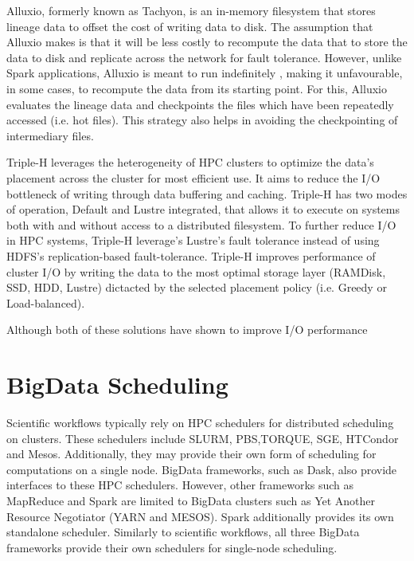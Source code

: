 \documentclass{report}
\begin{document}
                Alluxio, formerly known as Tachyon, is an in-memory filesystem
                that stores lineage data to offset the cost of writing data to 
                disk. The assumption that Alluxio makes is that it will be less
                costly to recompute the data that to store the data to disk and
                replicate across the network for fault tolerance. However,
                unlike Spark applications, Alluxio is meant to run indefinitely
                , making it unfavourable, in some cases, to recompute the data
                from its starting point. For this, Alluxio evaluates the 
                lineage data and checkpoints the files which have been 
                repeatedly accessed (i.e. hot files). This strategy also helps 
                in avoiding the checkpointing of intermediary files. 

                Triple-H leverages the heterogeneity of HPC clusters to 
                optimize the data's placement across the cluster for most 
                efficient use. It aims to reduce the I/O bottleneck of writing 
                through data buffering and caching. Triple-H has two modes of
                operation, Default and Lustre integrated,
                that allows it to execute on systems both with and without 
                access to a distributed filesystem. To further reduce I/O in
                HPC systems, Triple-H leverage's Lustre's fault tolerance 
                instead of using HDFS's replication-based fault-tolerance. 
                Triple-H improves 
                performance of cluster I/O by writing the data to
                the most optimal storage layer (RAMDisk, SSD, HDD, Lustre) 
                dictacted by the selected placement policy (i.e. Greedy or 
                Load-balanced). 

                Although both of these solutions have shown to improve I/O
                performance 
            
        \section{BigData Scheduling}\label{sched}
            
            Scientific workflows typically rely on HPC schedulers for 
            distributed scheduling on clusters. These schedulers include SLURM,
            PBS,TORQUE, SGE, HTCondor and Mesos. Additionally, they may provide
            their own form of scheduling for computations on a single node. 
            BigData frameworks, such as Dask,
            also provide interfaces to these HPC schedulers. However, other
            frameworks such as MapReduce and Spark are limited to BigData 
            clusters such as Yet Another Resource Negotiator (YARN and MESOS).
            Spark additionally provides its own standalone scheduler. Similarly
            to scientific workflows, all three BigData frameworks provide their
            own schedulers for single-node scheduling.
\end{document}
